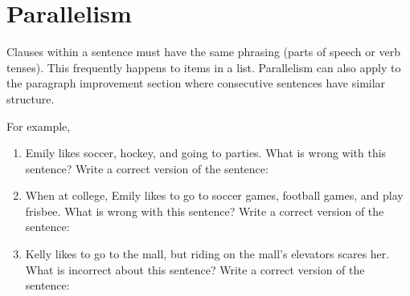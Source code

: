 \section{Parallelism}

Clauses within a sentence must have the same phrasing (parts of speech or verb tenses). This
frequently happens to items in a list. Parallelism can also apply to the paragraph improvement
section where consecutive sentences have similar structure.

\bigskip
For example,
\begin{enumerate}

\item{Emily likes soccer, hockey, and going to parties. What is wrong with this sentence?} \hrulefill
Write a correct version of the sentence: \hrulefill
\item{When at college, Emily likes to go to soccer games, football games, and play frisbee.} What
is wrong with this sentence? \hrulefill
Write a correct version of the sentence: \hrulefill
\item{Kelly likes to go to the mall, but riding on the mall's elevators scares her. What is incorrect
about this sentence?} \hrulefill
Write a correct version of the sentence: \hrulefill

\end{enumerate}
